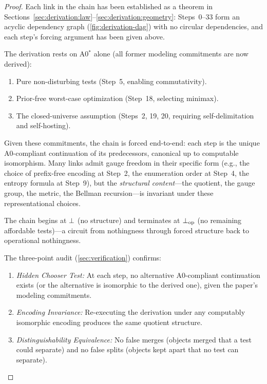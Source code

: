 \begin{proof}
Each link in the chain has been established as a theorem in
Sections~\ref{sec:derivation:law}--\ref{sec:derivation:geometry}:
Steps~0--33 form an acyclic dependency graph (\cref{fig:derivation-dag})
with no circular dependencies, and each step's forcing argument has been
given above.

The derivation rests on A0$^*$ alone (all former modeling commitments are now derived):
\begin{enumerate}[nosep]
  \item Pure non-disturbing tests (Step~5, enabling commutativity).
  \item Prior-free worst-case optimization (Step~18, selecting minimax).
  \item The closed-universe assumption (Steps~2, 19, 20, requiring
        self-delimitation and self-hosting).
\end{enumerate}
Given these commitments, the chain is forced end-to-end: each step is the
unique A0-compliant continuation of its predecessors, canonical up to
computable isomorphism.  Many links admit gauge freedom in their specific
form (e.g., the choice of prefix-free encoding at Step~2, the enumeration
order at Step~4, the entropy formula at Step~9), but the \emph{structural
content}---the quotient, the gauge group, the metric, the Bellman
recursion---is invariant under these representational choices.

The chain begins at $\bot$ (no structure) and terminates at $\bot_{\mathrm{op}}$
(no remaining affordable tests)---a circuit from nothingness through forced
structure back to operational nothingness.

The three-point audit (\cref{sec:verification}) confirms:
\begin{enumerate}[nosep]
  \item \emph{Hidden Chooser Test:} At each step, no alternative
        A0-compliant continuation exists (or the alternative is
        isomorphic to the derived one), given the paper's modeling
        commitments.
  \item \emph{Encoding Invariance:} Re-executing the derivation under any
        computably isomorphic encoding produces the same quotient structure.
  \item \emph{Distinguishability Equivalence:} No false merges (objects
        merged that a test could separate) and no false splits (objects
        kept apart that no test can separate).
\end{enumerate}


\end{proof}
